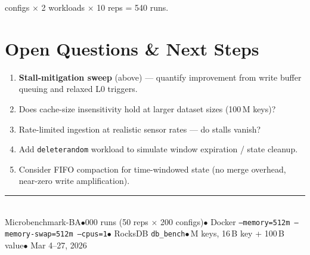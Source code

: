 \documentclass[10pt,a4paper]{scrartcl}
\begin{document}
 configs $\times$ 2 workloads $\times$ 10 reps = 540 runs.

\section{Open Questions \& Next Steps}

\begin{enumerate}
  \item \textbf{Stall-mitigation sweep} (above) --- quantify improvement from
        write buffer queuing and relaxed L0 triggers.
  \item Does cache-size insensitivity hold at larger dataset sizes (100\,M keys)?
  \item Rate-limited ingestion at realistic sensor rates --- do stalls vanish?
  \item Add \texttt{deleterandom} workload to simulate window expiration / state cleanup.
  \item Consider FIFO compaction for time-windowed state (no merge overhead,
        near-zero write amplification).
\end{enumerate}

\vfill
\noindent\color{footergray}\rule{\textwidth}{0.3pt}\\[2pt]
{\footnotesize\color{footergray}
  Microbenchmark-BA\enspace$\bullet$000 runs (50 reps $\times$ 200 configs)\enspace$\bullet$\enspace
  Docker \texttt{--memory=512m --memory-swap=512m --cpus=1}\enspace$\bullet$\enspace
  RocksDB \texttt{db\_bench}\enspace$\bullet$\,M keys, 16\,B key + 100\,B value\enspace$\bullet$\enspace
  Mar 4--27, 2026}
\end{document}
